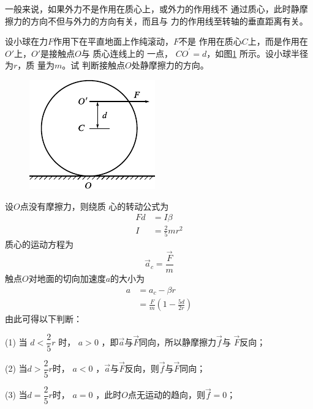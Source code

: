 一般来说，如果外力不是作用在质心上，或外力的作用线不
通过质心，此时静摩擦力的方向不但与外力的方向有关，而且与
力的作用线至转轴的垂直距离有关。

\example 设小球在力$ F $作用下在平直地面上作纯滚动，$ F $不是
作用在质心$ C $上，而是作用在$ O' $上，$ O' $是接触点$ O $与
质心连线上的
一点， $ C O ^ { \prime } = d $，如图\ref{fig:10.18} 所示。设小球半径为$ r $，质
量为$ m $。试
判断接触点$ O $处静摩擦力的方向。

\begin{figure}
    \centering
    \includegraphics{figure/fig10.18}
    \caption{}
    \label{fig:10.18}
\end{figure}
\solution 设$ O $点没有摩擦力，则绕质
心的转动公式为
\begin{equation*}
    \begin{split}
        F  d &= I \beta \\
        I &= \frac { 2 } { 5 } m r ^ { 2 }
    \end{split}
\end{equation*}
质心的运动方程为
\begin{equation*}
    \vec{a} _ { c } = \frac { \vec{F} } { m }
\end{equation*}
触点$ O $对地面的切向加速度$ a $的大小为
\begin{equation*}
    \begin{split}
        a &= a _ { c } - \beta r \\
          &= \frac { F } { m } \left( 1 - \frac { 5 d } { 2 r } \right)
    \end{split}
\end{equation*}
由此可得以下判断：

(1) 当 $  d < \dfrac { 2 } { 5 } r $  时， $ a > 0 $  ，即$ \vec{a} $与$ \vec{F} $同向，所以静摩擦力$ \vec{f} $与
$ \vec{F} $反向；

(2) 当$  d > \dfrac { 2 } { 5 } r $时， $ a < 0 $  ，$ \vec{a} $与$ \vec{F} $反向，则$ \vec{f} $与$ \vec{F} $同向；

(3) 当$  d = \dfrac { 2 } { 5 } r $时， $ a = 0 $  ，此时$ O $点无运动的趋向，则$ \vec{f} = 0   $；

